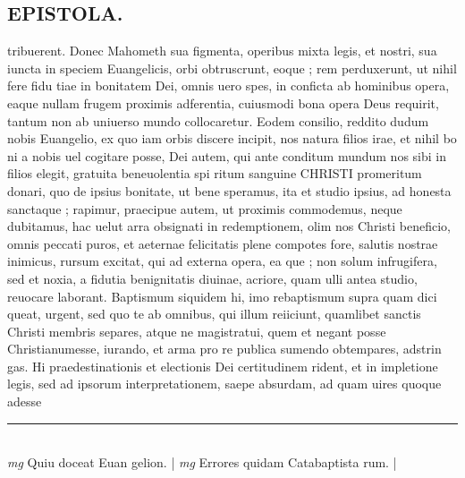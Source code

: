 \documentclass{article}
\begin{document}
\begin{pages}
\section*{EPISTOLA.  }\pstart tribuerent.  Donec Mahometh sua figmenta, operibus mixta legis, et nostri, sua iuncta in speciem Euangelicis, orbi obtruscrunt, eoque ; rem perduxerunt, ut nihil fere fidu tiae in bonitatem Dei, omnis uero spes, in conficta ab hominibus opera, eaque nullam frugem proximis adferentia, cuiusmodi bona opera Deus requirit, tantum non ab uniuerso mundo collocaretur.   \pend\pstart Eodem consilio, reddito dudum nobis Euangelio, ex quo iam orbis discere incipit, nos natura filios irae, et nihil bo ni a nobis uel cogitare posse, Dei autem, qui ante conditum mundum nos sibi in filios elegit, gratuita beneuolentia spi ritum sanguine CHRISTI promeritum donari, quo de ipsius bonitate, ut bene speramus, ita et studio ipsius, ad honesta sanctaque ; rapimur, praecipue autem, ut proximis commodemus, neque  dubitamus, hac uelut arra obsignati in redemptionem, olim nos Christi beneficio, omnis peccati puros, et aeternae felicitatis plene compotes fore, salutis nostrae inimicus, rursum excitat, qui ad externa opera, ea que ; non solum infrugifera, sed et noxia, a fidutia benignitatis diuinae, acriore, quam ulli antea studio, reuocare laborant.  Baptismum siquidem hi, imo rebaptismum supra quam dici queat, urgent, sed quo te ab omnibus, qui illum reiiciunt, quamlibet sanctis Christi membris separes, atque ne magistratui, quem et negant posse Christianumesse, iurando, et arma pro re publica sumendo obtempares, adstrin gas.  Hi praedestinationis et electionis Dei certitudinem rident, et in impletione legis, sed ad ipsorum interpretationem, saepe absurdam, ad quam uires quoque adesse  \pend
\vspace{0.5cm}\noindent
\vspace{0.2cm}\rule{1cm}{0.2pt}\\ 
\hspace{0.2cm}\textit{mg}
\footnotesize Quiu doceat Euan gelion.  
\normalsize| 
\hspace{0.2cm}\textit{mg}
\footnotesize Errores quidam Catabaptista rum.  
\normalsize| 

\end{pages}
\end{document}
